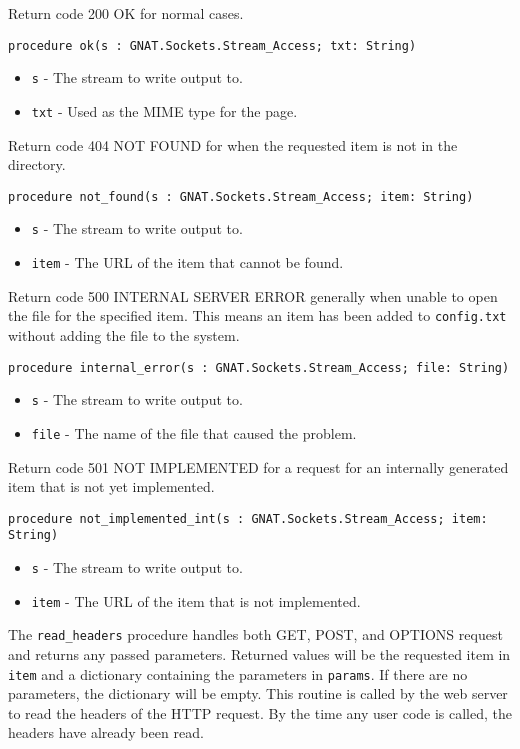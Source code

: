 \documentclass[10pt, openany]{book}
\newcommand{\function}[1]{\texttt{#1}}
\newcommand{\keyword}[1]{\texttt{#1}}
\newcommand{\filename}[1]{\texttt{#1}}
\begin{document}
Return code 200 OK for normal cases.
\begin{lstlisting}
procedure ok(s : GNAT.Sockets.Stream_Access; txt: String)
\end{lstlisting}
\begin{itemize}
  \item \keyword{s} - The stream to write output to.
  \item \keyword{txt} - Used as the MIME type for the page.
\end{itemize}
Return code 404 NOT FOUND for when the requested item is not in the directory.
\begin{lstlisting}
procedure not_found(s : GNAT.Sockets.Stream_Access; item: String)
\end{lstlisting}
\begin{itemize}
  \item \keyword{s} - The stream to write output to.
  \item \keyword{item} - The URL of the item that cannot be found.
\end{itemize}
Return code 500 INTERNAL SERVER ERROR generally when unable to open the file for the specified item.  This means an item has been added to \filename{config.txt} without adding the file to the system.
\begin{lstlisting}
procedure internal_error(s : GNAT.Sockets.Stream_Access; file: String)
\end{lstlisting}
\begin{itemize}
  \item \keyword{s} - The stream to write output to.
  \item \keyword{file} - The name of the file that caused the problem.
\end{itemize}
Return code 501 NOT IMPLEMENTED for a request for an internally generated item that is not yet implemented.
\begin{lstlisting}
procedure not_implemented_int(s : GNAT.Sockets.Stream_Access; item: String)
\end{lstlisting}
\begin{itemize}
  \item \keyword{s} - The stream to write output to.
  \item \keyword{item} - The URL of the item that is not implemented.
\end{itemize}
The \function{read\_headers} procedure handles both GET, POST, and OPTIONS request and returns any passed parameters.  Returned values will be the requested item in \keyword{item} and a dictionary containing the parameters in \keyword{params}.  If there are no parameters, the dictionary will be empty.  This routine is called by the web server to read the headers of the HTTP request.  By the time any user code is called, the headers have already been read.
\end{document}

